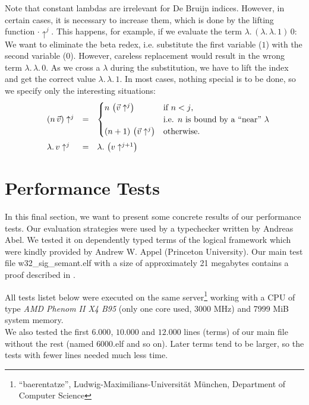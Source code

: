 \documentclass[12pt, a4paper, titlepage]{article}
\newcommand{\sspace}{\,}
\newcommand{\la}{\lambda}
\newcommand{\emphSec}[1]{#1}
\newcommand{\LaH}[1]{\la . \sspace #1}
\newcommand{\ApH}[2]{#1 \sspace #2}
\newcommand{\LaVH}[1]{\LaH #1} %
\newcommand{\lift}[2]{ #2 \uparrow^{#1}}
\let\stdsection\section
\renewcommand\section{\newpage\stdsection}
\begin{document}
Note that \emphSec{constant lambdas} are irrelevant for De Bruijn indices. However, in certain cases, it is necessary to increase them, which is done by the lifting function $\lift{j}{\cdot}$. This happens, for example, if we evaluate the term $\LaH{ \ApH {\left( \LaH{\LaH{1}} \right)}{0} }$: We want to eliminate the beta redex, i.e. substitute the first variable ($1$) with the second variable ($0$). However, careless replacement would result in the wrong term $\LaVH{\LaVH 0}$. As we cross a $\la$ during the substitution, we have to lift the index and get the correct value $\LaVH{\LaVH 1}$. 
In most cases, nothing special is to be done, so we specify only the interesting situations:
\[ 
\begin{array}{llll}
& \lift{j}{\left( n \sspace \vec v \right) } & = &  
\begin{cases}
 n \sspace \left( \lift{j}{\vec v}\right) & \text{if $n < j$,} \\ & \mbox{i.e. $n$ is bound by a ``near'' $\la$} \\
 (n+1) \sspace \left( \lift{j}{\vec v}\right) & \text{otherwise.} \\
\end{cases}\\
\noalign{\medskip}
& \lift{j}{\LaVH v} & = & \LaVH{\left( \lift{j+1}{v} \right) }
\end{array}
\]



\section{Performance Tests}\label{resultsection}

In this final section, we want to present some concrete results of our performance tests. Our evaluation strategies were used by a typechecker written by Andreas Abel. We tested it on dependently typed terms of the logical framework which were kindly provided by Andrew W. Appel (Princeton University). 
Our main test file \textsf{w32\_sig\_semant.elf} with a size of approximately 21 megabytes contains a proof described in \cite{appel}. 

All tests listet below were executed on the same server\footnote{``baerentatze'', Ludwig-Maximilians-Universit\"at M\"unchen, Department of Computer Science} working with a CPU of type \emph{AMD Phenom II X4 B95} (only one core used, 3000 MHz) and 7999 MiB system memory.
\\
We also tested the first $6.000$, $10.000$ and $12.000$ lines (terms) of our main file without the rest (named \textsf{6000.elf} and so on). Later terms tend to be larger, so the tests with fewer lines needed much less time. 
\end{document}
